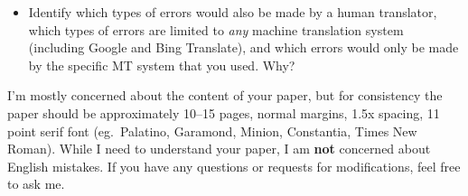 \documentclass[10pt]{article}
\begin{document}
\begin{spacing}{1.30}
\begin{itemize}
 Show a few examples to illustrate these.\footnote{List both the incorrect translation and what you think would be a good translation.}
 Also use charts and/or tables that summarize your quantitative analysis.
 Are there differences between genres/domains/registers in the frequencies of different types of errors?
 For example, does a genre have more cultural or fewer syntactic errors compared to another genre?
 If there are differences, why?

\item Identify which types of errors would also be made by a human translator, which types of errors are limited to \emph{any} machine translation system (including Google and Bing Translate), and which errors would only be made by the specific MT system that you used.
	Why?

\end{itemize}

I'm mostly concerned about the content of your paper, but for consistency the paper should be approximately 10--15 pages, normal margins, 1.5x spacing, 11 point serif font (eg.~Palatino, Garamond, Minion, Constantia, Times New Roman).
While I need to understand your paper, I am \textbf{not} concerned about English mistakes.
If you have any questions or requests for modifications, feel free to ask me.


\end{spacing}
%
\end{document}
